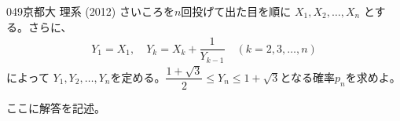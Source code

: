 \begin{prob}{049}{\maru}{京都大 理系 (2012)}
 さいころを$n$回投げて出た目を順に $X_1, X_2, \ldots, X_n$ とする。さらに、
 \begin{align*}
  Y_1=X_1,\quad Y_k=X_k+\dfrac{1}{Y_{k-1}} \quad (k=2,3,\ldots, n)
 \end{align*}
 によって $Y_1, Y_2, \ldots, Y_n$を定める。$\dfrac{1+\sqrt{3}}{2}\le Y_n \le 1+\sqrt{3}$となる確率$p_n$を求めよ。
\end{prob}
ここに解答を記述。